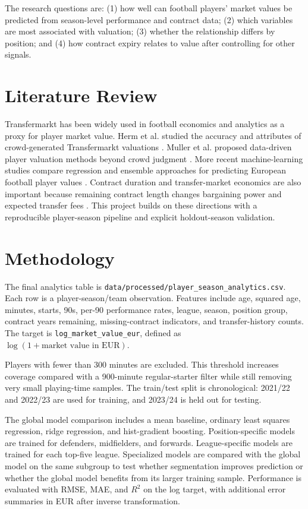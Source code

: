 \documentclass[conference]{IEEEtran}
\begin{document}
The research questions are: (1) how well can football players' market values be predicted from season-level performance and contract data; (2) which variables are most associated with valuation; (3) whether the relationship differs by position; and (4) how contract expiry relates to value after controlling for other signals.

\section{Literature Review}
Transfermarkt has been widely used in football economics and analytics as a proxy for player market value. Herm et al. studied the accuracy and attributes of crowd-generated Transfermarkt valuations \cite{herm2014crowd}. Muller et al. proposed data-driven player valuation methods beyond crowd judgment \cite{muller2017beyond}. More recent machine-learning studies compare regression and ensemble approaches for predicting European football player values \cite{aydemir2022ensemble,tamim2025football}. Contract duration and transfer-market economics are also important because remaining contract length changes bargaining power and expected transfer fees \cite{poli2022contract}. This project builds on these directions with a reproducible player-season pipeline and explicit holdout-season validation.

\section{Methodology}
The final analytics table is \texttt{data/processed/player\_season\_analytics.csv}. Each row is a player-season/team observation. Features include age, squared age, minutes, starts, 90s, per-90 performance rates, league, season, position group, contract years remaining, missing-contract indicators, and transfer-history counts. The target is \texttt{log\_market\_value\_eur}, defined as \(\log(1 + \text{market value in EUR})\).

Players with fewer than 300 minutes are excluded. This threshold increases coverage compared with a 900-minute regular-starter filter while still removing very small playing-time samples. The train/test split is chronological: 2021/22 and 2022/23 are used for training, and 2023/24 is held out for testing.

The global model comparison includes a mean baseline, ordinary least squares regression, ridge regression, and hist-gradient boosting. Position-specific models are trained for defenders, midfielders, and forwards. League-specific models are trained for each top-five league. Specialized models are compared with the global model on the same subgroup to test whether segmentation improves prediction or whether the global model benefits from its larger training sample. Performance is evaluated with RMSE, MAE, and \(R^2\) on the log target, with additional error summaries in EUR after inverse transformation.
\end{document}
